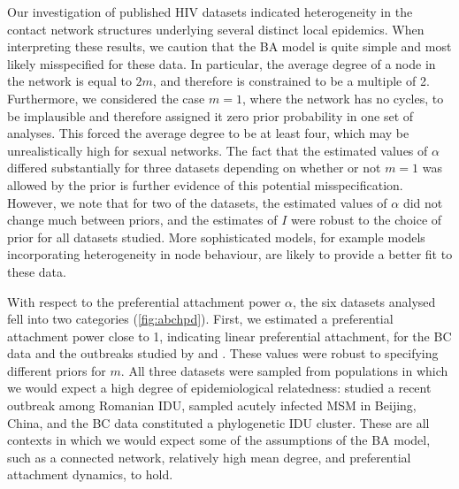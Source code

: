 Our investigation of published HIV datasets indicated heterogeneity in the
contact network structures underlying several distinct local epidemics. When
interpreting these results, we caution that the BA model is quite simple and
most likely misspecified for these data. In particular, the average degree of a
node in the network is equal to $2m$, and therefore is constrained to be a
multiple of 2. Furthermore, we considered the case $m = 1$, where the network
has no cycles, to be implausible and therefore assigned it zero prior
probability in one set of analyses. This forced the average degree to be at
least four, which may be unrealistically high for sexual networks. The fact
that the estimated values of $\alpha$ differed substantially for three datasets
depending on whether or not $m = 1$ was allowed by the prior is further evidence
of this potential misspecification. However, we note that for two of the
datasets, the estimated values of $\alpha$ did not change much between priors,
and the estimates of $I$ were robust to the choice of prior for all datasets
studied. More sophisticated models, for example models incorporating
heterogeneity in node behaviour, are likely to provide a better fit to these
data.

With respect to the preferential attachment power $\alpha$, the six datasets
analysed fell into two categories (\cref{fig:abchpd}). First, we estimated a
preferential attachment power close to 1, indicating linear preferential
attachment, for the BC data and the outbreaks studied by
\textcite{niculescu2015recent} and \textcite{wang2015targeting}. These values
were robust to specifying different priors for $m$. All three datasets were
sampled from populations in which we would expect a high degree of
epidemiological relatedness: \textcite{niculescu2015recent} studied a recent
outbreak among Romanian \gls{IDU}, \citeauthor{wang2015targeting} sampled
acutely infected MSM in Beijing, China, and the BC data constituted a
phylogenetic \gls{IDU} cluster. These are all contexts in which we would expect
some of the assumptions of the BA model, such as a connected network,
relatively high mean degree, and preferential attachment dynamics, to hold.

